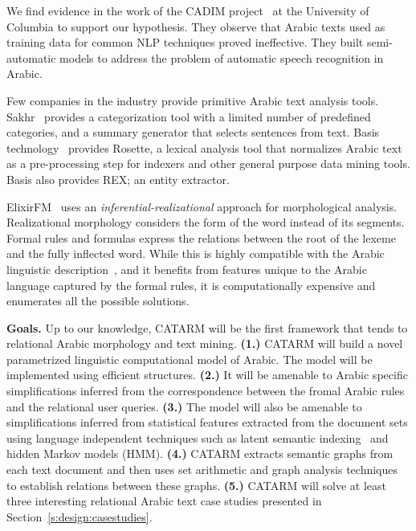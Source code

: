 \documentclass[12pt]{article}
\newcommand{\noTrRL}[1]{\transfalse\RL{#1}\transtrue}
\begin{document}
We find evidence in the work of the CADIM \noTrRL{q-adim} 
project~\cite{Col09} at the University of Columbia to support our 
hypothesis. They observe that Arabic texts used as training 
data for common NLP techniques proved ineffective. 
They built semi-automatic models to address the problem of automatic 
speech recognition in Arabic.


Few companies in the industry provide primitive Arabic text 
analysis tools.
Sakhr~\cite{Sak09} provides a categorization 
tool with a limited number of predefined categories, and a summary 
generator that selects sentences from text.
Basis technology~\cite{Bas09} provides Rosette, a lexical 
analysis tool that normalizes Arabic text as a pre-processing step 
for indexers and other general purpose data mining 
tools.  Basis also provides REX; an entity extractor.

ElixirFM~\cite{Otakar:07} uses an {\em inferential-realizational}
approach for morphological analysis. 
Realizational morphology considers the form of the word 
\noTrRL{.sarf}  instead of its segments. 
Formal rules and formulas express the relations between 
the root of the lexeme and the fully inflected word. 
While this is highly compatible with the Arabic linguistic 
description~\cite{Badawi:04},
and it benefits from features unique to the Arabic language
captured by the formal rules, 
it is computationally expensive and enumerates all the possible
solutions. 

{\bf Goals.} Up to our knowledge, CATARM will be the 
first framework that tends to relational Arabic morphology 
and text mining. 
{\bf (1.)} CATARM will build a novel parametrized linguistic 
computational model of Arabic. 
The model will be implemented using efficient structures. 
 {\bf (2.)} It will be amenable to Arabic specific simplifications 
inferred from the correspondence between the fromal Arabic rules
and the relational user queries.
{\bf (3.)} The model will also be amenable to simplifications 
inferred from statistical features extracted from the document 
sets using language independent techniques such as latent semantic 
indexing~\cite{LSI89} and hidden Markov models (HMM).
{\bf (4.)} CATARM extracts semantic graphs from each text 
document and then uses set arithmetic and graph analysis techniques
to establish relations between these graphs. {\bf (5.)} CATARM will 
solve at least three interesting relational Arabic text case studies 
presented in Section~\ref{s:design:casestudies}.
\end{document}
